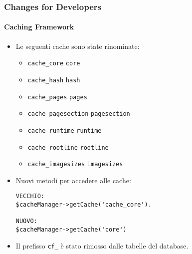
\begin{frame}[fragile]
	\frametitle{Changes for Developers}
	\framesubtitle{Caching Framework}

	\lstset{basicstyle=\tiny\ttfamily}

	\begin{itemize}
		\item Le seguenti cache sono state rinominate:

			\begin{itemize}\smaller
				\item \texttt{cache\_core} \textrightarrow\hspace{0.1cm}\texttt{core}
				\item \texttt{cache\_hash} \textrightarrow\hspace{0.1cm}\texttt{hash}
				\item \texttt{cache\_pages} \textrightarrow\hspace{0.1cm}\texttt{pages}
				\item \texttt{cache\_pagesection} \textrightarrow\hspace{0.1cm}\texttt{pagesection}
				\item \texttt{cache\_runtime} \textrightarrow\hspace{0.1cm}\texttt{runtime}
				\item \texttt{cache\_rootline} \textrightarrow\hspace{0.1cm}\texttt{rootline}
				\item \texttt{cache\_imagesizes} \textrightarrow\hspace{0.1cm}\texttt{imagesizes}
			\end{itemize}\normalsize

		\item Nuovi metodi per accedere alle cache:

\begin{lstlisting}
VECCHIO:
$cacheManager->getCache('cache_core').

NUOVO:
$cacheManager->getCache('core')
\end{lstlisting}

		\item Il prefisso \texttt{cf\_} è stato rimosso dalle tabelle del database.
	\end{itemize}

\end{frame}

